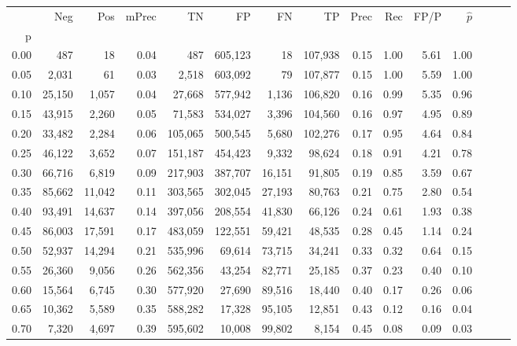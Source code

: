 \begin{tabular}{rrrrrrrrrrrrrrr}
\toprule
{} &     Neg &     Pos & mPrec &       TN &       FP &       FN &       TP &  Prec &   Rec &  FP/P & $\hat{p}$ \\
p    &         &         &       &          &          &          &          &       &       &       &           \\
\midrule
0.00 &     487 &      18 &  0.04 &      487 &  605,123 &       18 &  107,938 &  0.15 &  1.00 &  5.61 &      1.00 \\
0.05 &   2,031 &      61 &  0.03 &    2,518 &  603,092 &       79 &  107,877 &  0.15 &  1.00 &  5.59 &      1.00 \\
0.10 &  25,150 &   1,057 &  0.04 &   27,668 &  577,942 &    1,136 &  106,820 &  0.16 &  0.99 &  5.35 &      0.96 \\
0.15 &  43,915 &   2,260 &  0.05 &   71,583 &  534,027 &    3,396 &  104,560 &  0.16 &  0.97 &  4.95 &      0.89 \\
0.20 &  33,482 &   2,284 &  0.06 &  105,065 &  500,545 &    5,680 &  102,276 &  0.17 &  0.95 &  4.64 &      0.84 \\
0.25 &  46,122 &   3,652 &  0.07 &  151,187 &  454,423 &    9,332 &   98,624 &  0.18 &  0.91 &  4.21 &      0.78 \\
0.30 &  66,716 &   6,819 &  0.09 &  217,903 &  387,707 &   16,151 &   91,805 &  0.19 &  0.85 &  3.59 &      0.67 \\
0.35 &  85,662 &  11,042 &  0.11 &  303,565 &  302,045 &   27,193 &   80,763 &  0.21 &  0.75 &  2.80 &      0.54 \\
0.40 &  93,491 &  14,637 &  0.14 &  397,056 &  208,554 &   41,830 &   66,126 &  0.24 &  0.61 &  1.93 &      0.38 \\
0.45 &  86,003 &  17,591 &  0.17 &  483,059 &  122,551 &   59,421 &   48,535 &  0.28 &  0.45 &  1.14 &      0.24 \\
0.50 &  52,937 &  14,294 &  0.21 &  535,996 &   69,614 &   73,715 &   34,241 &  0.33 &  0.32 &  0.64 &      0.15 \\
0.55 &  26,360 &   9,056 &  0.26 &  562,356 &   43,254 &   82,771 &   25,185 &  0.37 &  0.23 &  0.40 &      0.10 \\
0.60 &  15,564 &   6,745 &  0.30 &  577,920 &   27,690 &   89,516 &   18,440 &  0.40 &  0.17 &  0.26 &      0.06 \\
0.65 &  10,362 &   5,589 &  0.35 &  588,282 &   17,328 &   95,105 &   12,851 &  0.43 &  0.12 &  0.16 &      0.04 \\
0.70 &   7,320 &   4,697 &  0.39 &  595,602 &   10,008 &   99,802 &    8,154 &  0.45 &  0.08 &  0.09 &      0.03 \\

\end{tabular}
